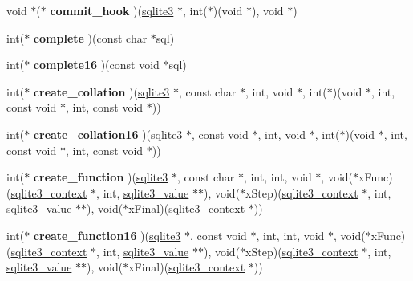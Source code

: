 \begin{DoxyCompactItemize}
\item 
\hypertarget{structsqlite3__api__routines_a1fd4d534756988a2d709acffeb91d68a}{void $\ast$($\ast$ {\bfseries commit\-\_\-hook} )(\hyperlink{structsqlite3}{sqlite3} $\ast$, int($\ast$)(void $\ast$), void $\ast$)}\label{structsqlite3__api__routines_a1fd4d534756988a2d709acffeb91d68a}

\item 
\hypertarget{structsqlite3__api__routines_a4bd1a90b2a40c58ecc1c2ceb67be48f5}{int($\ast$ {\bfseries complete} )(const char $\ast$sql)}\label{structsqlite3__api__routines_a4bd1a90b2a40c58ecc1c2ceb67be48f5}

\item 
\hypertarget{structsqlite3__api__routines_ae3e27f61b6c43cf549360f1bb8b3b591}{int($\ast$ {\bfseries complete16} )(const void $\ast$sql)}\label{structsqlite3__api__routines_ae3e27f61b6c43cf549360f1bb8b3b591}

\item 
\hypertarget{structsqlite3__api__routines_aed840be5b7cc7add4f21ba88f1981f58}{int($\ast$ {\bfseries create\-\_\-collation} )(\hyperlink{structsqlite3}{sqlite3} $\ast$, const char $\ast$, int, void $\ast$, int($\ast$)(void $\ast$, int, const void $\ast$, int, const void $\ast$))}\label{structsqlite3__api__routines_aed840be5b7cc7add4f21ba88f1981f58}

\item 
\hypertarget{structsqlite3__api__routines_a2f05772713bb942bff670352a96ee1e6}{int($\ast$ {\bfseries create\-\_\-collation16} )(\hyperlink{structsqlite3}{sqlite3} $\ast$, const void $\ast$, int, void $\ast$, int($\ast$)(void $\ast$, int, const void $\ast$, int, const void $\ast$))}\label{structsqlite3__api__routines_a2f05772713bb942bff670352a96ee1e6}

\item 
\hypertarget{structsqlite3__api__routines_aaf30781efad4fb70111f391e6fe20a9c}{int($\ast$ {\bfseries create\-\_\-function} )(\hyperlink{structsqlite3}{sqlite3} $\ast$, const char $\ast$, int, int, void $\ast$, void($\ast$x\-Func)(\hyperlink{structsqlite3__context}{sqlite3\-\_\-context} $\ast$, int, \hyperlink{struct_mem}{sqlite3\-\_\-value} $\ast$$\ast$), void($\ast$x\-Step)(\hyperlink{structsqlite3__context}{sqlite3\-\_\-context} $\ast$, int, \hyperlink{struct_mem}{sqlite3\-\_\-value} $\ast$$\ast$), void($\ast$x\-Final)(\hyperlink{structsqlite3__context}{sqlite3\-\_\-context} $\ast$))}\label{structsqlite3__api__routines_aaf30781efad4fb70111f391e6fe20a9c}

\item 
\hypertarget{structsqlite3__api__routines_a0c3f05b118b89293ff5d35774504b44d}{int($\ast$ {\bfseries create\-\_\-function16} )(\hyperlink{structsqlite3}{sqlite3} $\ast$, const void $\ast$, int, int, void $\ast$, void($\ast$x\-Func)(\hyperlink{structsqlite3__context}{sqlite3\-\_\-context} $\ast$, int, \hyperlink{struct_mem}{sqlite3\-\_\-value} $\ast$$\ast$), void($\ast$x\-Step)(\hyperlink{structsqlite3__context}{sqlite3\-\_\-context} $\ast$, int, \hyperlink{struct_mem}{sqlite3\-\_\-value} $\ast$$\ast$), void($\ast$x\-Final)(\hyperlink{structsqlite3__context}{sqlite3\-\_\-context} $\ast$))}\label{structsqlite3__api__routines_a0c3f05b118b89293ff5d35774504b44d}


\end{DoxyCompactItemize}
